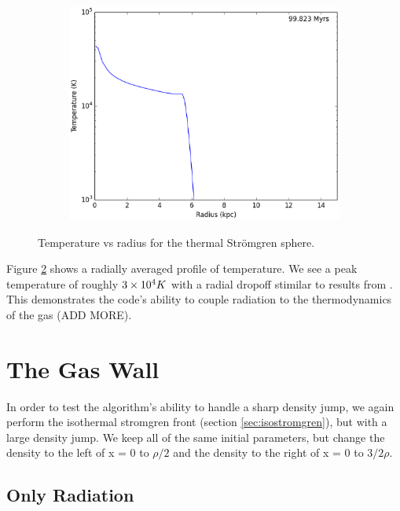 \begin{figure}
        ~
        \begin{subfigure}[b]{0.3\textwidth}
                \includegraphics[width=\textwidth]{graphics/ifrontThermal6400200Tempprofile.eps}
                \label{fig:stromgrenthermal500}
        \end{subfigure}
        \caption[Temperature vs radius for the thermal Str\"omgren sphere.]{Temperature vs radius for the thermal Str\"omgren sphere.}
        \label{fig:stromgrenthermal}
\end{figure}

Figure \ref{fig:stromgrenthermal} shows a radially averaged profile of temperature. We see a peak temperature of roughly $3\times 10^{4} K$ with a radial dropoff stimilar to results from \citet{ilievEt06}. This demonstrates the code's ability to couple radiation to the thermodynamics of the gas (ADD MORE).

\section{The Gas Wall}
\label{sec:gaswall}

In order to test the algorithm's ability to handle a sharp density jump, we again perform the isothermal stromgren front (section \ref{sec:isostromgren}), but with a large density jump. We keep all of the same initial parameters, but change the density to the left of x = 0 to $\rho/2$ and the density to the right of x = 0 to $3/2 \rho$.

\subsection{Only Radiation}
\label{sec:gaswallradonly}

